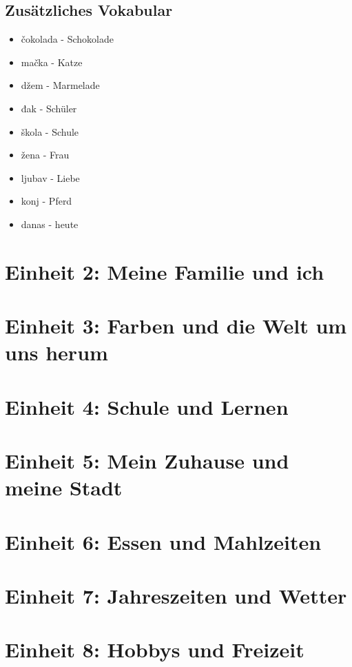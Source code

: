 \subsection*{Zusätzliches Vokabular}
\begin{itemize}
    \item čokolada - Schokolade
    \item mačka - Katze
    \item džem - Marmelade
    \item đak - Schüler
    \item škola - Schule
    \item žena - Frau
    \item ljubav - Liebe
    \item konj - Pferd
    \item danas - heute
\end{itemize}

\section{Einheit 2: Meine Familie und ich}

\section{Einheit 3: Farben und die Welt um uns herum}

\section{Einheit 4: Schule und Lernen}

\section{Einheit 5: Mein Zuhause und meine Stadt}

\section{Einheit 6: Essen und Mahlzeiten}

\section{Einheit 7: Jahreszeiten und Wetter}

\section{Einheit 8: Hobbys und Freizeit}

